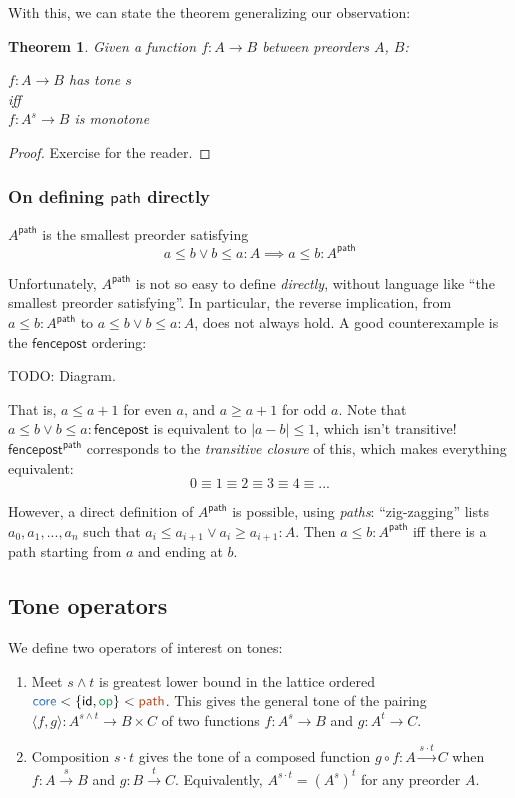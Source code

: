 \documentclass{article}
\newtheorem{theorem}{Theorem}
\newcommand{\todo}[1]{{\color{red}#1}}
\newcommand{\ms}[1]{\ensuremath{\mathsf{#1}}}
\newcommand{\op}{\ms{op}}
\newcommand{\iso}{\ms{core}}
\renewcommand{\path}{\ms{path}}
\newcommand{\tm}{{\ms{id}}}     %
\newcommand{\ta}{{\color{ForestGreen}\ensuremath{\op}}}    %
\newcommand{\ti}{{\color{NavyBlue}\ensuremath{\iso}}} %
\newcommand{\tb}{{\color{Bittersweet}\ensuremath{\path}}}  %
\newcommand{\tc}{\cdot}         %
\begin{document}
With this, we can state the theorem generalizing our observation:
\begin{theorem} Given a function $f : A \to B$ between preorders $A$, $B$:
  \begin{center}
    $f : A \to B$ has tone $s$\vspace{0.5em}\\
    \emph{iff}\vspace{0.5em}\\
    $f : A^s \to B$ is monotone
  \end{center}
\end{theorem}

\begin{proof} Exercise for the reader. \end{proof}

\subsubsection{On defining \ms{path} directly} \label{sec:defining-path}

$A^\path$ is the smallest preorder satisfying
\[ a \le b \vee b \le a : A \implies a \le b : A^\path \]

Unfortunately, $A^\path$ is not so easy to define \emph{directly}, without
language like ``the smallest preorder satisfying''.
%
In particular, the reverse implication, from $a \le b : A^\path$ to $a \le b
\vee b \le a : A$, does not always hold. A good counterexample is the
\ms{fencepost} ordering:

\todo{TODO: Diagram}.

That is, $a \le a+1$ for even $a$, and $a \ge a+1$ for odd $a$. Note that $a \le
b \vee b \le a : \ms{fencepost}$ is equivalent to $|a-b| \le 1$, which isn't
transitive! $\ms{fencepost}^\path$ corresponds to the \emph{transitive closure}
of this, which makes everything equivalent:
\[ 0 \equiv 1 \equiv 2 \equiv 3 \equiv 4 \equiv ... \]

However, a direct definition of $A^\path$ is possible, using \emph{paths}:
``zig-zagging'' lists $a_0, a_1, ..., a_n$ such that $a_i \le a_{i+1} \vee a_i
\ge a_{i+1} : A$. Then $a \le b : A^\path$ iff there is a path starting from $a$
and ending at $b$.


\subsection{Tone operators}

We define two operators of interest on tones:
\begin{enumerate}
\item Meet $s \wedge t$ is greatest lower bound in the lattice ordered $\ti <
  \{\tm, \ta\} < \tb$. This gives the general tone of the pairing $\langle f,
  g\rangle : A^{s \wedge t} \to B \times C$ of two functions $f : A^s \to B$ and
  $g : A^{t} \to C$.

\item Composition $s \tc t$ gives the tone of a composed function $g \circ f : A
  \overset{s\tc t}{\to} C$ when $f : A \overset{s}{\to} B$ and $g : B
  \overset{t}{\to} C$. Equivalently, $A^{s\tc t} = (A^s)^t$ for any preorder
  $A$.
\end{enumerate}
\end{document}
